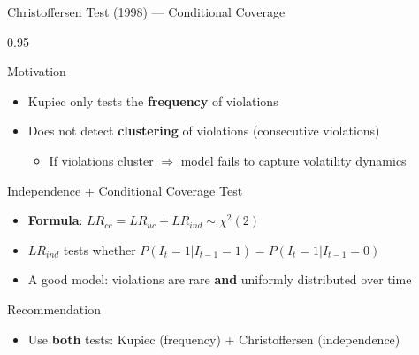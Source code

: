 \documentclass[9pt, aspectratio=169, t]{beamer}
\begin{document}
\begin{frame}{Christoffersen Test (1998) --- Conditional Coverage}
\small
    \begin{cminipage}{0.95\textwidth}
    \begin{block}{Motivation}
        \begin{itemize}\setlength{\itemsep}{0pt}
            \item Kupiec only tests the \textbf{frequency} of violations
            \item Does not detect \textbf{clustering} of violations (consecutive violations)
                \begin{itemize}\setlength{\itemsep}{0pt}
                    \item If violations cluster $\Rightarrow$ model fails to capture volatility dynamics
                \end{itemize}
        \end{itemize}
    \end{block}
    \vspace{-0.1cm}
    \begin{block}{Independence + Conditional Coverage Test}
        \begin{itemize}\setlength{\itemsep}{0pt}
            \item \textbf{Formula}: $LR_{cc} = LR_{uc} + LR_{ind} \sim \chi^2(2)$
            \item $LR_{ind}$ tests whether $P(I_t = 1 | I_{t-1} = 1) = P(I_t = 1 | I_{t-1} = 0)$
            \item A good model: violations are rare \textbf{and} uniformly distributed over time
        \end{itemize}
    \end{block}
    \vspace{-0.1cm}
    \begin{alertblock}{Recommendation}
        \begin{itemize}\setlength{\itemsep}{0pt}
            \item Use \textbf{both} tests: Kupiec (frequency) + Christoffersen (independence)
        \end{itemize}
    \end{alertblock}
    \end{cminipage}
\end{frame}
\end{document}
